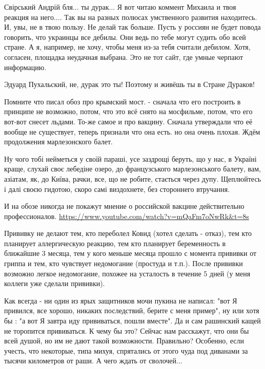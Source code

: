 \begin{itemize}

Свірський Андрій бля... ты дурак... Я вот читаю коммент Михаила и твоя реакция
на него.... Так вы на разных полюсах умственного развития находитесь. И, увы,
не в твою пользу. Не делай так больше. Пусть у россиян не будет повода
говорить, что украинцы все дебилы. Они ведь по тебе могут судить обо всей
стране. А я, например, не хочу, чтобы меня из-за тебя считали дебилом. Хотя,
согласен, площадка неудачная выбрана. Это не тот сайт, где умные черпают
информацию.


Эдуард Пухальский, не, дурак это ты! Поэтому и живёшь ты в Стране Дураков!


Помните что писал обоз про крымский мост. - сначала что его построить в
принципе не возможно, потом, что это всё снято на мосфильме, потом, что его
вот-вот снесет льдами. То-же самое и про вакцину. Сначала утверждали что её
вообще не существует, теперь признали что она есть. но она очень плохая. Ждём
продолжения марлезонского балет.


Ну чого тобі нейметься у своїй параші, усе заздрощі беруть, що у нас, в Україні
краще, слухай своє лебедіне озеро, до французського марлезонського балету, вам,
азіатам, як, до Київа, рачки, все, що не робите, стається через дупу.
Щеплюйтесь і далі своєю гидотою, скоро самі виздохнете, без стороннего
втручання.


И на обозе никогда не покажут мнение о российской вакцине действительно
профессионалов. \url{https://www.youtube.com/watch?v=mQaFm7oNwRk&t=8s}


Прививку не делают тем, кто переболел Ковид (хотел сделать - отказ), тем кто
планирует аллергическую реакцию, тем кто планирует беременность в ближайшие 3
месяца, тем у кого меньше месяца прошло с момента прививки от гриппа и тем, кто
чувствует недомогание (простуда и т.п.). После прививки возможно легкое
недомогание, похожее на усталость в течение 5 дней (у меня коллеги уже сделали
прививки).


Как всегда - ни один из ярых защитников мочи пукина не написал: "вот Я
привился, все хорошо, никаких последствий, берите с меня пример", ну или хотя
бы : "а вот Я завтра иду прививаться, пошли вместе". Да и сам рашинский кащей
не торопится прививаться. К чему бы это? Сейчас нам расскажут, что они бы всей
душой, но им не дают такой возможности. Правильно? Особенно, если учесть, что
некоторые, типа михуя, спрятались от этого чуда под диванами за тысячи
километров от раши. А чего ждать от сволочей...


\end{itemize}
